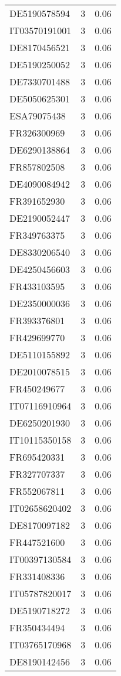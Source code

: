 \begin{table*}[htbp]
\begin{tabular}{lrr}
DE5190578594 & 3 & 0.06 \\
IT03570191001 & 3 & 0.06 \\
DE8170456521 & 3 & 0.06 \\
DE5190250052 & 3 & 0.06 \\
DE7330701488 & 3 & 0.06 \\
DE5050625301 & 3 & 0.06 \\
ESA79075438 & 3 & 0.06 \\
FR326300969 & 3 & 0.06 \\
DE6290138864 & 3 & 0.06 \\
FR857802508 & 3 & 0.06 \\
DE4090084942 & 3 & 0.06 \\
FR391652930 & 3 & 0.06 \\
DE2190052447 & 3 & 0.06 \\
FR349763375 & 3 & 0.06 \\
DE8330206540 & 3 & 0.06 \\
DE4250456603 & 3 & 0.06 \\
FR433103595 & 3 & 0.06 \\
DE2350000036 & 3 & 0.06 \\
FR393376801 & 3 & 0.06 \\
FR429699770 & 3 & 0.06 \\
DE5110155892 & 3 & 0.06 \\
DE2010078515 & 3 & 0.06 \\
FR450249677 & 3 & 0.06 \\
IT07116910964 & 3 & 0.06 \\
DE6250201930 & 3 & 0.06 \\
IT10115350158 & 3 & 0.06 \\
FR695420331 & 3 & 0.06 \\
FR327707337 & 3 & 0.06 \\
FR552067811 & 3 & 0.06 \\
IT02658620402 & 3 & 0.06 \\
DE8170097182 & 3 & 0.06 \\
FR447521600 & 3 & 0.06 \\
IT00397130584 & 3 & 0.06 \\
FR331408336 & 3 & 0.06 \\
IT05787820017 & 3 & 0.06 \\
DE5190718272 & 3 & 0.06 \\
FR350434494 & 3 & 0.06 \\
IT03765170968 & 3 & 0.06 \\
DE8190142456 & 3 & 0.06 \\

\end{tabular}
\end{table*}
